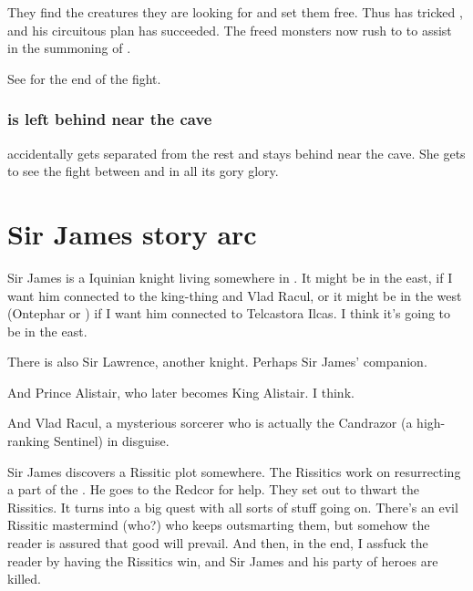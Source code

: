 They find the creatures they are looking for and set them free. Thus \Ishnaruchaefir{} has tricked \Teshrial{}, and his circuitous plan has succeeded. The freed monsters now rush to \Malcur to assist in the summoning of \Nithdornazsh. 

See  for the end of the fight.






\subsubsection{\Shilred{} is left behind near the cave}
\Shilred{} accidentally gets separated from the rest and stays behind near the cave. 
She gets to see the fight between \Ishnaruchaefir{} and \Teshrial{} in all its gory glory. 















\section{Sir James story arc}
Sir James is a \human{} Iquinian knight living somewhere in \Velcad{}. 
It might be in the east, if I want him connected to the king-thing and Vlad Racul, or it might be in the west (Ontephar or \Scyrum) if I want him connected to Telcastora Ilcas. 
I think it's going to be in the east. 

There is also Sir Lawrence, another knight. 
Perhaps Sir James' companion. 

And Prince Alistair, who later becomes King Alistair. 
I think. 

And Vlad Racul, a mysterious sorcerer who is actually the \dragon{} Candrazor (a high-ranking Sentinel) in disguise. 

Sir James discovers a Rissitic plot somewhere. 
The Rissitics work on resurrecting a part of the \Haskelek{} \daemon. 
He goes to the Redcor for help. They set out to thwart the Rissitics. 
It turns into a big quest with all sorts of stuff going on. 
There's an evil Rissitic mastermind (who?) who keeps outsmarting them, but somehow the reader is assured that good will prevail. 
And then, in the end, I assfuck the reader by having the Rissitics win, and Sir James and his party of heroes are killed. 




